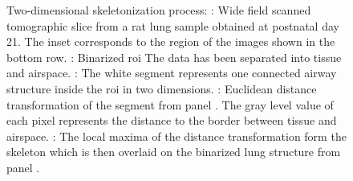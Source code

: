 \begin{figure}[htb]
{{			\label{subfig:skel-c}%
			}%
	}%
	\caption[\twod skeletonization]{Two-dimensional skeletonization process: : Wide field scanned tomographic slice from a rat lung sample obtained at postnatal day 21. The inset corresponds to the region of the images shown in the bottom row. : Binarized \ac{roi} The data has been separated into tissue and airspace. : The white segment represents one connected airway structure inside the \ac{roi} in two dimensions. : Euclidean distance transformation of the segment from panel . The gray level value of each pixel represents the distance to the border between tissue and airspace. : The local maxima of the distance transformation form the skeleton which is then overlaid on the binarized lung structure from panel .}%
	\label{fig:skeletonization}%
\end{figure}

